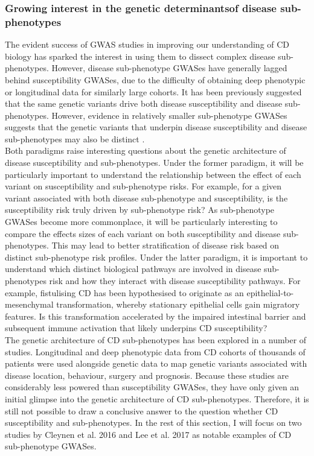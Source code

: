 \subsubsection{Growing interest in the genetic determinantsof disease sub-phenotypes}
The evident success of GWAS studies in improving our understanding of CD biology has sparked the interest in using them to dissect complex disease sub-phenotypes. However, disease sub-phenotype GWASes have generally lagged behind susceptibility GWASes, due to the difficulty of obtaining deep phenotypic or longitudinal data for similarly large cohorts. It has been previously suggested that the same genetic variants drive both disease susceptibility and disease sub-phenotypes. However, evidence in relatively smaller sub-phenotype GWASes suggests that the genetic variants that underpin disease susceptibility and disease sub-phenotypes may also be distinct \cite{Iwaki2019-mf,Severe_Covid-19_GWAS_Group2020-rn}.\\

Both paradigms raise interesting questions about the genetic architecture of disease susceptibility and sub-phenotypes. Under the former paradigm, it will be particularly important to understand the relationship between the effect of each variant on susceptibility and sub-phenotype risks. For example, for a given variant associated with both disease sub-phenotype and susceptibility, is the susceptibility risk truly driven by sub-phenotype risk? As sub-phenotype GWASes become more commonplace, it will be particularly interesting to compare the effects sizes of each variant on both susceptibility and disease sub-phenotypes. This may lead to better stratification of disease risk based on distinct sub-phenotype risk profiles. Under the latter paradigm, it is important to understand which distinct biological pathways are involved in disease sub-phenotypes risk and how they interact with disease susceptibility pathways. For example, fistulising CD has been hypothesised to originate as an epithelial-to-mesenchymal transformation, whereby stationary epithelial cells gain migratory features. Is this transformation accelerated by the impaired intestinal barrier and subsequent immune activation that likely underpins CD susceptibility?\\

The genetic architecture of CD sub-phenotypes has been explored in a number of studies. Longitudinal and deep phenotypic data from CD cohorts of thousands of patients were used alongside genetic data to map genetic variants associated with disease location, behaviour, surgery and prognosis. Because these studies are considerably less powered than susceptibility GWASes, they have only given an initial glimpse into the genetic architecture of CD sub-phenotypes. Therefore, it is still not possible to draw a conclusive answer to the question whether CD susceptibility and sub-phenotypes. In the rest of this section, I will focus on two studies by Cleynen et al. 2016 \cite{Cleynen2016-ha} and Lee et al. 2017 \cite{Lee2017-tl} as notable examples of CD sub-phenotype GWASes. \\

